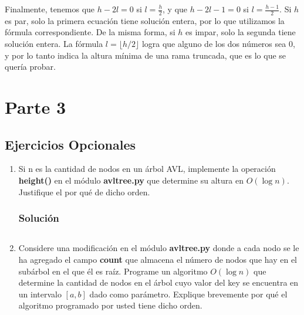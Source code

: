 \documentclass{article}
\begin{document}
Finalmente, tenemos que $h-2l=0$ si $l=\frac{h}{2}$, y que $h-2l-1=0$ si $l=\frac{h-1}{2}$. Si $h$ es par, solo la primera ecuación tiene solución entera, por lo que utilizamos la fórmula correspondiente. De la misma forma, si $h$ es impar, solo la segunda tiene solución entera. La fórmula $l = \lfloor h/2 \rfloor$ logra que alguno de los dos números sea 0, y por lo tanto indica la altura mínima de una rama truncada, que es lo que se quería probar.


\section*{Parte 3}
\subsection*{Ejercicios Opcionales}
\begin{enumerate}
    \item Si n es la cantidad de nodos en un árbol AVL, implemente la operación \textbf{height()} en el módulo \textbf{avltree.py} que determine su altura en $O(\log n)$. Justifique el por qué de dicho orden.
    \subsubsection*{Solución}
    \inputminted{python3}{./code/snippets/ejercicioopcional1.py}
    
    \item Considere una modificación en el módulo \textbf{avltree.py} donde a cada nodo se le ha agregado el campo \textbf{count} que almacena el número de nodos que hay en el subárbol en el que él es raíz. Programe un algoritmo $O(\log n)$ que determine la cantidad de nodos en el árbol cuyo valor del key se encuentra en un intervalo $[a, b]$ dado como parámetro. Explique brevemente por qué el algoritmo programado por usted tiene dicho orden.
\end{enumerate}
\end{document}
